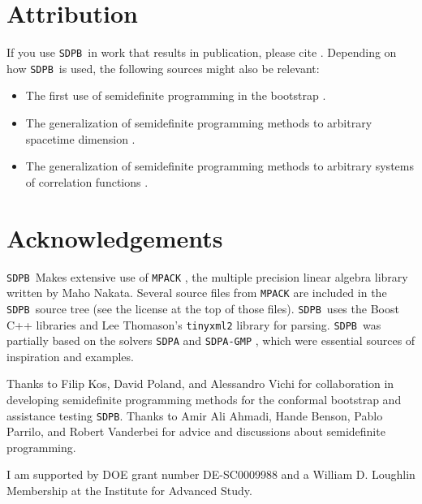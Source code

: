 \documentclass[12pt]{article}
\numberwithin{equation}{section}
\newcommand\SDPB{\texttt{SDPB}}
\begin{document}
\section{Attribution}

If you use \SDPB\ in work that results in publication, please cite \cite{DSD}. Depending on how \SDPB\ is used, the following sources might also be relevant:
\begin{itemize}
\item The first use of semidefinite programming in the bootstrap \cite{Poland:2011ey}.
\item The generalization of semidefinite programming methods to arbitrary
spacetime dimension \cite{Kos:2013tga}.
\item The generalization of semidefinite programming methods to arbitrary
systems of correlation functions \cite{Kos:2014bka}.
\end{itemize}

\section{Acknowledgements}

\SDPB\ Makes extensive use of \texttt{MPACK} \cite{MPACK}, the multiple precision linear algebra library written by Maho Nakata.  Several source files from \texttt{MPACK} are included in the \SDPB\ source tree (see the license at the top of those files). \SDPB\ uses the Boost C++ libraries \cite{BoostSite} and Lee Thomason's \texttt{tinyxml2} library \cite{TINYXML2} for parsing.
\SDPB\ was partially based on the solvers \texttt{SDPA} and \texttt{SDPA-GMP} \cite{SDPA,SDPA2,SDPAGMP}, which were essential sources of inspiration and examples.

Thanks to Filip Kos, David Poland, and Alessandro Vichi for collaboration in developing semidefinite programming methods for the conformal bootstrap and assistance testing \SDPB.  Thanks to Amir Ali Ahmadi, Hande Benson, Pablo Parrilo, and Robert Vanderbei for advice and discussions about semidefinite programming.

I am supported by DOE grant number DE-SC0009988 and a William D. Loughlin Membership at the Institute for Advanced Study.
\end{document}
